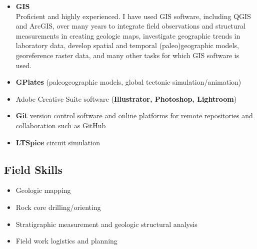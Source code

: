 \documentclass[10pt,a4paper,sans]{moderncv}
\begin{document}
\begin{itemize}[itemsep=-3pt]
    \item \textbf{GIS}\\ 
        Proficient and highly experienced. I have used GIS software, including
        QGIS and ArcGIS, over many years to integrate field observations and
        structural measurements in creating geologic maps, investigate
        geographic trends in laboratory data, develop spatial and temporal
        (paleo)geographic models, georeference raster data, and many other tasks
        for which GIS software is used.
        
    \item \textbf{GPlates} (paleogeographic models, global tectonic simulation/animation)
        
    \item Adobe Creative Suite software (\textbf{Illustrator,
        Photoshop, Lightroom})
 \item \textbf{Git} version control software and online platforms for
     remote repositories and collaboration such as GitHub
   \item \textbf{LTSpice} circuit simulation
\end{itemize}

\subsection{Field Skills}

\begin{itemize}
 \item Geologic mapping
 \item Rock core drilling/orienting
 \item Stratigraphic measurement and geologic structural analysis
 \item Field work logistics and planning
\end{itemize}


\end{document}
